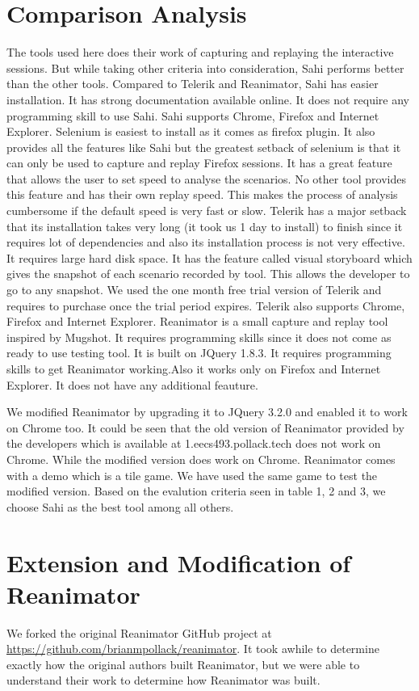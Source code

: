 \documentclass[12pt,journal]{IEEEtran}
\begin{document}
\section{Comparison Analysis}
The tools used here does their work of capturing and replaying the interactive sessions. But while taking other criteria into consideration, Sahi performs better than the other tools. Compared to Telerik and Reanimator, Sahi has easier installation. It has strong documentation available online. It does not require any programming skill to use Sahi. Sahi supports Chrome, Firefox and Internet Explorer. Selenium is easiest to install as it comes as firefox plugin. It also provides all the features like Sahi but the greatest setback of selenium is that it can only be used to capture and replay Firefox sessions. It has a great feature that allows the user to set speed to analyse the scenarios. No other tool provides this feature and has their own replay speed. This makes the process of analysis cumbersome if the default speed is very fast or slow. Telerik has a major setback that its installation takes very long (it took us 1 day to install) to finish since it requires lot of dependencies and also its installation process is not very effective. It requires large hard disk space. It has the feature called visual storyboard which gives the snapshot of each scenario recorded by tool. This allows the developer to go to any snapshot. We used the one month free trial version of Telerik and requires to purchase once the trial period expires. Telerik also supports Chrome, Firefox and Internet Explorer. Reanimator is a small capture and replay tool inspired by Mugshot. It requires programming skills since it does not come as ready to use testing tool. It is built on JQuery 1.8.3. It requires programming skills to get Reanimator working.Also it works only on Firefox and Internet Explorer. It does not have any additional feauture.
\par
We modified Reanimator by upgrading it to JQuery 3.2.0 and enabled it to work on Chrome too. It could be seen that the old version of Reanimator provided by the developers which is available at 1.eecs493.pollack.tech does not work on Chrome. While the modified version does work on Chrome. Reanimator comes with a demo which is a tile game. We have used the same game to test the modified version.
 Based on the evalution criteria seen in table 1, 2 and 3, we choose Sahi as the best tool among all others.


\section{Extension and Modification of Reanimator}
We forked the original Reanimator GitHub project at \href{https://github.com/brianmpollack/reanimator}{https://github.com/brianmpollack/reanimator}. It took awhile to determine exactly how the original authors built Reanimator, but we were able to understand their work to determine how Reanimator was built.
\end{document}
